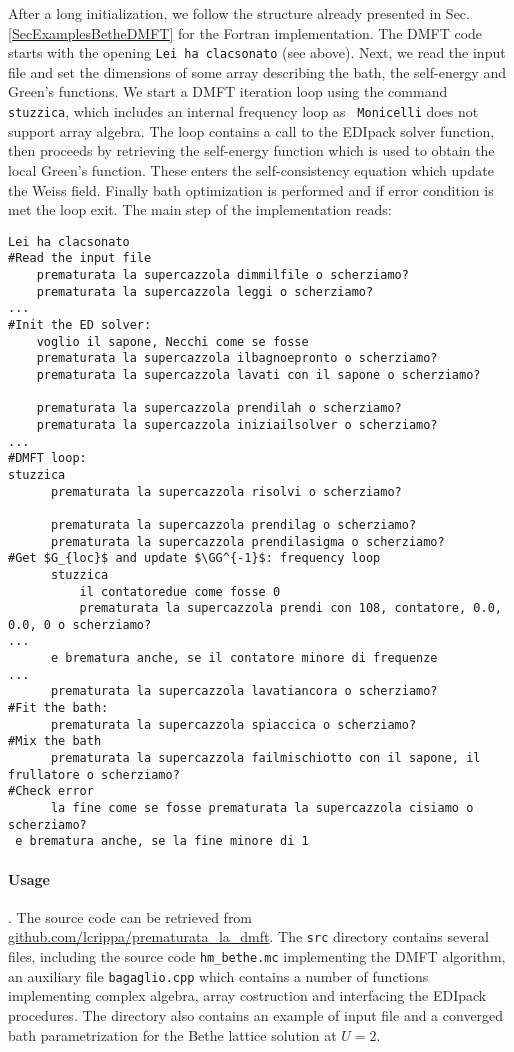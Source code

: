 \documentclass[preprint,3p,10pt]{elsarticle}
\newcommand{\secu}[1]
{Sec.\,\ref{#1}}
\def\GG{{\cal G}} \def\SS{{\cal S}}
\def\NAME{{\rm EDIpack}\xspace}
\begin{document}
After a long initialization, we follow the structure already presented
in \secu{SecExamplesBetheDMFT} for the Fortran implementation.
The DMFT code starts with the opening {\tt Lei ha clacsonato} (see
above). Next, we read the input file and set the dimensions of some
array describing the bath, the self-energy and Green's
functions. We start a DMFT iteration loop using the command {\tt
  stuzzica}, which includes an internal frequency loop as {\tt
  Monicelli} does not support array algebra.
The loop contains a call to the \NAME solver function, then proceeds
by retrieving the self-energy function which is used to obtain the
local Green's function. These enters the self-consistency equation
which update the Weiss field. Finally bath optimization is performed
and if error condition is met the loop exit.
The main step of the implementation reads: 


\begin{lstlisting}[style=cstyle]
Lei ha clacsonato
#Read the input file
    prematurata la supercazzola dimmilfile o scherziamo?
    prematurata la supercazzola leggi o scherziamo? 
...                                                  
#Init the ED solver:
    voglio il sapone, Necchi come se fosse
    prematurata la supercazzola ilbagnoepronto o scherziamo?
    prematurata la supercazzola lavati con il sapone o scherziamo?
        
    prematurata la supercazzola prendilah o scherziamo?
    prematurata la supercazzola iniziailsolver o scherziamo?
...
#DMFT loop:
stuzzica    
      prematurata la supercazzola risolvi o scherziamo?
      
      prematurata la supercazzola prendilag o scherziamo?
      prematurata la supercazzola prendilasigma o scherziamo?
#Get $G_{loc}$ and update $\GG^{-1}$: frequency loop
      stuzzica                   
          il contatoredue come fosse 0
          prematurata la supercazzola prendi con 108, contatore, 0.0, 0.0, 0 o scherziamo?
...
      e brematura anche, se il contatore minore di frequenze
...      
      prematurata la supercazzola lavatiancora o scherziamo?
#Fit the bath:       
      prematurata la supercazzola spiaccica o scherziamo?
#Mix the bath           
      prematurata la supercazzola failmischiotto con il sapone, il frullatore o scherziamo?
#Check error      
      la fine come se fosse prematurata la supercazzola cisiamo o scherziamo?         
 e brematura anche, se la fine minore di 1
\end{lstlisting}

\paragraph{Usage}.
The source code can be retrieved from
\href{https://github.com/lcrippa/prematurata_la_dmft}{github.com/lcrippa/prematurata\_la\_dmft}. 
The {\tt src} directory contains several files, including the source
code {\tt hm\_bethe.mc} implementing the DMFT algorithm, an auxiliary file {\tt bagaglio.cpp} which
contains a number of functions implementing complex algebra, array
costruction and interfacing the \NAME procedures. The directory also
contains an example of input file and a converged bath parametrization
for the Bethe lattice solution at $U=2$.
\end{document}
